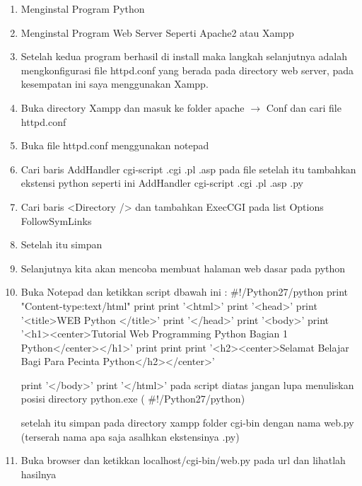 \begin{enumerate}
	\item Menginstal Program Python  
	\item Menginstal Program Web Server Seperti Apache2 atau Xampp  
	\item Setelah kedua program berhasil di install maka langkah selanjutnya adalah mengkonfigurasi file httpd.conf yang berada pada directory web server, pada kesempatan ini saya menggunakan Xampp. 
	\item Buka directory Xampp dan masuk ke folder apache  $  \rightarrow  $ Conf dan cari file httpd.conf 
	\item Buka file httpd.conf menggunakan notepad 
	\item Cari baris AddHandler cgi-script .cgi .pl .asp pada file setelah itu tambahkan ekstensi python seperti ini AddHandler cgi-script .cgi .pl .asp .py 
	\item Cari baris <Directory /> dan tambahkan ExecCGI pada list Options FollowSymLinks  
	\item Setelah itu simpan 
	\item Selanjutnya kita akan mencoba membuat halaman web dasar pada python 
	\item Buka Notepad dan ketikkan script dbawah ini : 
	$  \#  $!/Python27/python 
	print "Content-type:text/html"
	print 
	print '<html>' 
	print '<head>' 
	print '<title>WEB Python </title>' 
	print '</head>' 
	print '<body>' 
	print '<h1><center>Tutorial Web Programming Python Bagian 1 Python</center></h1>' 
	print 
	print 
	print '<h2><center>Selamat Belajar Bagi Para Pecinta Python</h2></center>' 
	
	print '</body>' 
	print '</html>' 
	pada script diatas jangan lupa menuliskan posisi directory python.exe ( $  \#  $!/Python27/python) 
	
	setelah itu simpan pada directory xampp folder cgi-bin dengan nama web.py (terserah nama apa saja asalhkan ekstensinya .py) 
	
	\item Buka browser dan ketikkan localhost/cgi-bin/web.py pada url dan lihatlah hasilnya
\end{enumerate}

